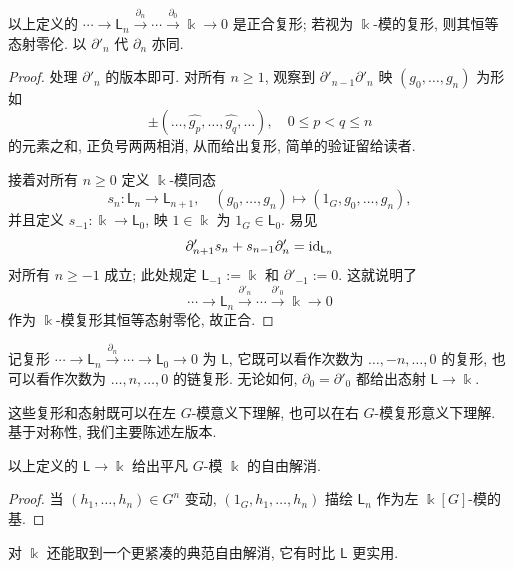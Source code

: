 \begin{lemma}\label{prop:L-acyclic}
	以上定义的 $\cdots \to \mathsf{L}_n \xrightarrow{\partial_n} \cdots \xrightarrow{\partial_0} \Bbbk \to 0$ 是正合复形; 若视为 $\Bbbk$-模的复形, 则其恒等态射零伦. 以 $\partial'_n$ 代 $\partial_n$ 亦同.
\end{lemma}
\begin{proof}
	处理 $\partial'_n$ 的版本即可. 对所有 $n \geq 1$, 观察到 $\partial'_{n-1} \partial'_n$ 映 $(g_0, \ldots, g_n)$ 为形如
	\[ \pm (\ldots, \widehat{g_p}, \ldots, \widehat{g_q}, \ldots), \quad 0 \leq p < q \leq n \]
	的元素之和, 正负号两两相消, 从而给出复形, 简单的验证留给读者.
	
	接着对所有 $n \geq 0$ 定义 $\Bbbk$-模同态
	\[ s_n: \mathsf{L}_n \to \mathsf{L}_{n+1}, \quad (g_0, \ldots, g_n) \mapsto (1_G, g_0, \ldots, g_n), \]
	并且定义 $s_{-1}: \Bbbk \to \mathsf{L}_0$, 映 $1 \in \Bbbk$ 为 $1_G \in \mathsf{L}_0$. 易见
	\[ \partial'_{n+1} s_n + s_{n-1} \partial'_n = \mathrm{id}_{\mathsf{L}_n} \]
	对所有 $n \geq -1$ 成立; 此处规定 $\mathsf{L}_{-1} := \Bbbk$ 和 $\partial'_{-1} := 0$. 这就说明了
	\[ \cdots \to \mathsf{L}_n \xrightarrow{\partial'_n} \cdots \xrightarrow{\partial'_0} \Bbbk \to 0 \]
	作为 $\Bbbk$-模复形其恒等态射零伦, 故正合.
\end{proof}

记复形 $\cdots \to \mathsf{L}_n \xrightarrow{\partial_n} \cdots \to \mathsf{L}_0 \to 0$ 为 $\mathsf{L}$, 它既可以看作次数为 $\ldots, -n, \ldots, 0$ 的复形, 也可以看作次数为 $\ldots, n, \ldots, 0$ 的链复形. 无论如何, $\partial_0 = \partial'_0$ 都给出态射 $\mathsf{L} \to \Bbbk$.

这些复形和态射既可以在左 $G$-模意义下理解, 也可以在右 $G$-模复形意义下理解. 基于对称性, 我们主要陈述左版本.

\begin{proposition}\label{prop:trivial-mod-resolution}
	以上定义的 $\mathsf{L} \to \Bbbk$ 给出平凡 $G$-模 $\Bbbk$ 的自由解消.
\end{proposition}
\begin{proof}
	当 $(h_1, \ldots, h_n) \in G^n$ 变动, $(1_G, h_1, \ldots, h_n)$ 描绘 $\mathsf{L}_n$ 作为左 $\Bbbk[G]$-模的基.
\end{proof}

对 $\Bbbk$ 还能取到一个更紧凑的典范自由解消, 它有时比 $\mathsf{L}$ 更实用.

